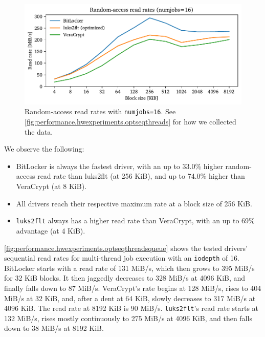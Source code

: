 \begin{figure}[htb!]
	\center
	\includegraphics[scale=1]{../fig/performance.hwexperiments.optrandthreads.pdf}
	\caption[
		Random-access read rates with \texttt{numjobs=16}
	]{
		Random-access read rates with \texttt{numjobs=16}. See \autoref{fig:performance.hwexperiments.optseqthreads} for how we collected the data.
	}
	\label{fig:performance.hwexperiments.optrandthreads}
\end{figure}

We observe the following:
\begin{itemize}
	\item BitLocker is always the fastest driver, with an up to 33.0\% higher random-access read rate than luks2flt (at 256 KiB), and up to 74.0\% higher than VeraCrypt (at 8 KiB).
	\item All drivers reach their respective maximum rate at a block size of 256 KiB.
	\item \texttt{luks2flt} always has a higher read rate than VeraCrypt, with an up to 69\% advantage (at 4 KiB).
\end{itemize}

\autoref{fig:performance.hwexperiments.optseqthreadsqueue} shows the tested drivers' sequential read rates for multi-thread job execution with an \texttt{iodepth} of 16. BitLocker starts with a read rate of 131 MiB/s, which then grows to 395 MiB/s for 32 KiB blocks. It then jaggedly decreases to 328 MiB/s at 4096 KiB, and finally falls down to 87 MiB/s. VeraCrypt's rate begins at 128 MiB/s, rises to 404 MiB/s at 32 KiB, and, after a dent at 64 KiB, slowly decreases to 317 MiB/s at 4096 KiB. The read rate at 8192 KiB is 90 MiB/s. \texttt{luks2flt}'s read rate starts at 132 MiB/s, rises mostly continuously to 275 MiB/s at 4096 KiB, and then falls down to 38 MiB/s at 8192 KiB.

